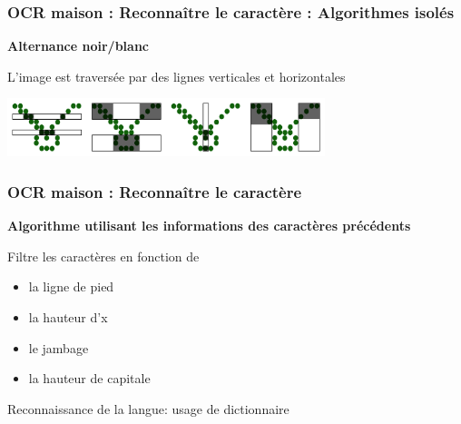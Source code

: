 \documentclass[xcolor=dvipsnames]{beamer}
\begin{document}
\begin{frame}
  \frametitle{OCR maison : Reconnaître le caractère : Algorithmes isolés}

  \begin{center}\begin{alertblock}{}
    \begin{center}\textbf{\Large Alternance noir/blanc}\end{center}
  \end{alertblock}\end{center}

  \begin{center}
    L'image est traversée par des lignes verticales et horizontales
   
	\includegraphics[width=350px]{chmoll-alternation.png}
  \end{center}
  
\end{frame}


\begin{frame}
  \frametitle{OCR maison : Reconnaître le caractère}

  \begin{center}\begin{alertblock}{}
    \begin{center}\textbf{\Large Algorithme utilisant les informations des caractères précédents}\end{center}
  \end{alertblock}\end{center}
  
  \begin{center}
    Filtre les caractères en fonction de

    \begin{itemize}
    \item la ligne de pied
    \item la hauteur d'x
    \item le jambage
    \item la hauteur de capitale
    \end{itemize}
  \end{center}

  \begin{center}
    Reconnaissance de la langue: usage de dictionnaire
  \end{center}
  
\end{frame}

  
\end{document}
